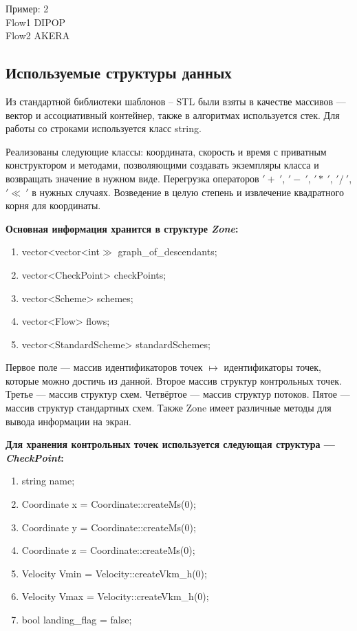\documentclass[12pt, a4 paper]{article}
\theoremstyle{plain}
\begin{document}
Пример:
2\\
Flow1 DIPOP\\
Flow2 AKERA

\newpage


\subsection{Используемые структуры данных}

Из стандартной библиотеки шаблонов – STL были взяты в качестве массивов --- вектор и ассоциативный контейнер, также в алгоритмах используется стек. Для работы со строками используется класс string.

Реализованы следующие классы: координата, скорость и время с приватным конструктором и методами, позволяющими создавать экземпляры класса и возвращать значение в нужном виде. Перегрузка операторов $ '+~'$, $'-~'$, $'\ast~'$, $'/~'$, $'\ll~'$ в нужных случаях. Возведение в целую степень и извлечение квадратного корня для координаты.

\textbf{Основная информация хранится в структуре \textit{Zone}:}
\begin{enumerate}
	\item vector<vector<int$\gg$ graph\_of\_descendants;
	\item vector<CheckPoint> checkPoints;
	\item vector<Scheme> schemes;
	\item vector<Flow> flows;
	\item vector<StandardScheme> standardSchemes;
\end{enumerate}


Первое поле --- массив идентификаторов точек $\mapsto$ идентификаторы точек, которые можно достичь из данной. Второе массив структур контрольных точек. Третье --- массив структур схем. Четвёртое --- массив структур потоков. Пятое --- массив структур стандартных схем. Также Zone имеет различные методы для вывода информации на экран.


\textbf{Для хранения контрольных точек используется следующая структура --- \textit{CheckPoint}:}

\begin{enumerate}
	\item string name;
	\item Coordinate x = Coordinate::createMs(0);
	\item Coordinate y = Coordinate::createMs(0);
	\item Coordinate z = Coordinate::createMs(0);
	\item Velocity Vmin = Velocity::createVkm\_h(0);
	\item Velocity Vmax = Velocity::createVkm\_h(0);
	\item bool landing\_flag = false;
\end{enumerate}
\end{document}
